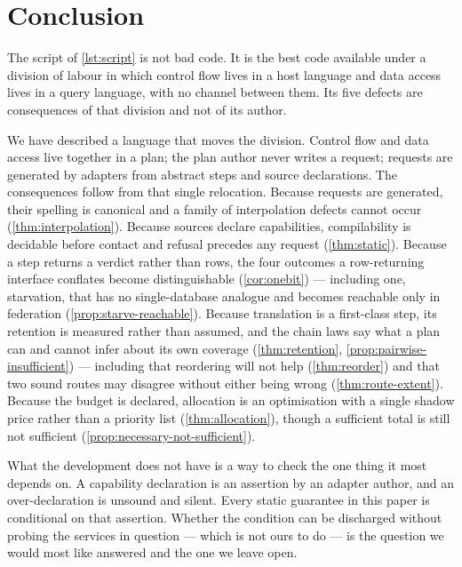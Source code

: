 \section{Conclusion}
\label{sec:conclusion}

The script of \cref{lst:script} is not bad code. It is the best code available
under a division of labour in which control flow lives in a host language and
data access lives in a query language, with no channel between them. Its five
defects are consequences of that division and not of its author.

We have described a language that moves the division. Control flow and data
access live together in a plan; the plan author never writes a request; requests
are generated by adapters from abstract steps and source declarations. The
consequences follow from that single relocation. Because requests are generated,
their spelling is canonical and a family of interpolation defects cannot occur
(\cref{thm:interpolation}). Because sources declare capabilities, compilability
is decidable before contact and refusal precedes any request
(\cref{thm:static}). Because a step returns a verdict rather than rows, the four
outcomes a row-returning interface conflates become distinguishable
(\cref{cor:onebit}) --- including one, starvation, that has no single-database
analogue and becomes reachable only in federation
(\cref{prop:starve-reachable}). Because translation is a first-class step, its
retention is measured rather than assumed, and the chain laws say what a plan
can and cannot infer about its own coverage
(\cref{thm:retention}, \cref{prop:pairwise-insufficient}) --- including that
reordering will not help (\cref{thm:reorder}) and that two sound routes may
disagree without either being wrong (\cref{thm:route-extent}). Because the
budget is declared, allocation is an optimisation with a single shadow price
rather than a priority list (\cref{thm:allocation}), though a sufficient total
is still not sufficient (\cref{prop:necessary-not-sufficient}).

What the development does not have is a way to check the one thing it most
depends on. A capability declaration is an assertion by an adapter author, and
an over-declaration is unsound and silent. Every static guarantee in this paper
is conditional on that assertion. Whether the condition can be discharged
without probing the services in question --- which is not ours to do --- is the
question we would most like answered and the one we leave open.
